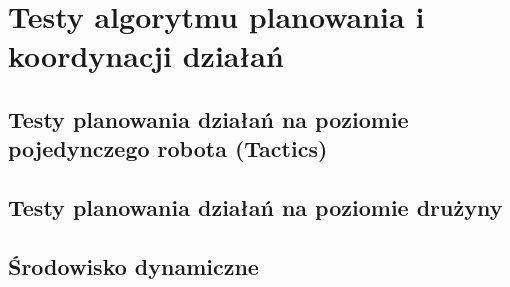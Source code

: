 \chapter{Testy algorytmu planowania i koordynacji działań}

\section{Testy planowania działań na poziomie pojedynczego robota (Tactics)}

\section{Testy planowania działań na poziomie drużyny}

\section{Środowisko dynamiczne}

